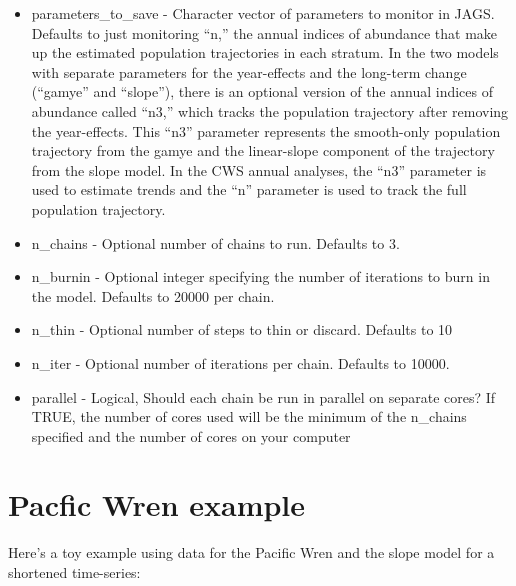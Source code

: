 \documentclass[
]{book}
\begin{document}
\begin{itemize}
\item
  parameters\_to\_save - Character vector of parameters to monitor in JAGS. Defaults to just monitoring ``n,'' the annual indices of abundance that make up the estimated population trajectories in each stratum. In the two models with separate parameters for the year-effects and the long-term change (``gamye'' and ``slope''), there is an optional version of the annual indices of abundance called ``n3,'' which tracks the population trajectory after removing the year-effects. This ``n3'' parameter represents the smooth-only population trajectory from the gamye and the linear-slope component of the trajectory from the slope model. In the CWS annual analyses, the ``n3'' parameter is used to estimate trends and the ``n'' parameter is used to track the full population trajectory.
\item
  n\_chains - Optional number of chains to run. Defaults to 3.
\item
  n\_burnin - Optional integer specifying the number of iterations to burn in the model. Defaults to 20000 per chain.
\item
  n\_thin - Optional number of steps to thin or discard. Defaults to 10
\item
  n\_iter - Optional number of iterations per chain. Defaults to 10000.
\item
  parallel - Logical, Should each chain be run in parallel on separate cores? If TRUE, the number of cores used will be the minimum of the n\_chains specified and the number of cores on your computer
\end{itemize}

\hypertarget{pacfic-wren-example}{%
\section{Pacfic Wren example}\label{pacfic-wren-example}}

Here's a toy example using data for the Pacific Wren and the slope model for a shortened time-series:
\end{document}
